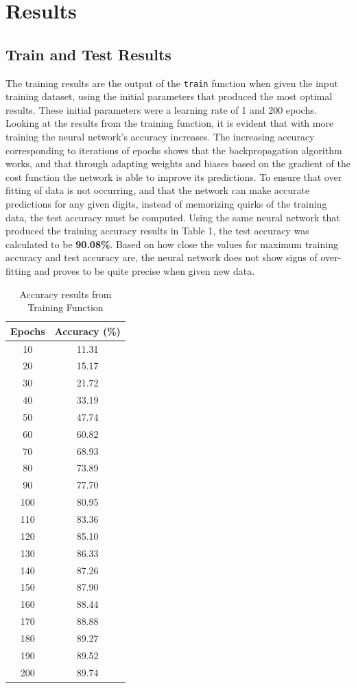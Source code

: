 \documentclass[twocolumn]{article}
\begin{document}
\section{Results}
\subsection{Train and Test Results}
The training results are the output of the \texttt{train} function when given the input training dataset, using the initial parameters that produced the most optimal results. These initial parameters were a learning rate of 1 and 200 epochs. Looking at the results from the training function, it is evident that with more training the neural network's accuracy increases. The increasing accuracy corresponding to iterations of epochs shows that the backpropagation algorithm works, and that through adapting weights and biases based on the gradient of the cost function the network is able to improve its predictions. To ensure that over fitting of data is not occurring, and that the network can make accurate predictions for any given digits, instead of memorizing quirks of the training data, the test accuracy must be computed. Using the same neural network that produced the training accuracy results in Table 1, the test accuracy was calculated to be \textbf{90.08\%}. Based on how close the values for maximum training accuracy and test accuracy are, the neural network does not show signs of over-fitting and proves to be quite precise when given new data. 
\begin{table}[ht]
\caption{Accuracy results from Training Function}
\label{ta:territory-tabular-both}
\centering
\begin{tabular}[t]{cc} 
\toprule
 \textbf{Epochs} & \textbf{Accuracy (\%)} \\ 
\midrule
    10  &  11.31  \\
    20 & 15.17\\
    30 & 21.72\\
    40 & 33.19 \\
    50 & 47.74\\
    60 & 60.82\\
    70 & 68.93\\
    80 & 73.89\\
    90 & 77.70\\
    100 & 80.95\\
    110 & 83.36\\
    120 & 85.10\\
    130 & 86.33\\
    140 & 87.26\\
    150 & 87.90\\
    160 & 88.44\\
    170 & 88.88\\
    180 & 89.27\\
    190 & 89.52\\
    200 & 89.74\\                               
\bottomrule
\end{tabular}
\end{table}
\end{document}
